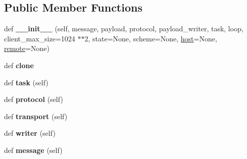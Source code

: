 \subsection*{Public Member Functions}
\begin{DoxyCompactItemize}
\item 
\mbox{\label{classaiohttp_1_1web__request_1_1_base_request_a1777c70c6eaea5a199db30a0bf94ff0c}} 
def {\bfseries \+\_\+\+\_\+init\+\_\+\+\_\+} (self, message, payload, protocol, payload\+\_\+writer, task, loop, client\+\_\+max\+\_\+size=1024 $\ast$$\ast$2, state=None, scheme=None, \hyperlink{classaiohttp_1_1web__request_1_1_base_request_acc2beb36001bae7487e95bdff02a4b3e}{host}=None, \hyperlink{classaiohttp_1_1web__request_1_1_base_request_a004b797508d01c804f7dea392ecc5e93}{remote}=None)
\item 
\mbox{\label{classaiohttp_1_1web__request_1_1_base_request_a8cba8bd9f0e8f7c05ef5b4ab94f5f2b4}} 
def {\bfseries clone}
\item 
\mbox{\label{classaiohttp_1_1web__request_1_1_base_request_a1e3e3e8de1d2b7fcbd15c0ce0bfd7700}} 
def {\bfseries task} (self)
\item 
\mbox{\label{classaiohttp_1_1web__request_1_1_base_request_a7c5ebf7c028bcf88eeff5352c7775bdc}} 
def {\bfseries protocol} (self)
\item 
\mbox{\label{classaiohttp_1_1web__request_1_1_base_request_a411df6d04b61bfb9e20e289a16732563}} 
def {\bfseries transport} (self)
\item 
\mbox{\label{classaiohttp_1_1web__request_1_1_base_request_a0f120095143dc9106e492181d207054c}} 
def {\bfseries writer} (self)
\item 
\mbox{\label{classaiohttp_1_1web__request_1_1_base_request_a0e7baad787e3f23143def8696e247df5}} 
def {\bfseries message} (self)
\item 
\mbox{\label{classaiohttp_1_1web__request_1_1_base_request_ae3ae092c2e956c196e4ea4c37051c684}} 
$$
\end{DoxyCompactItemize}
